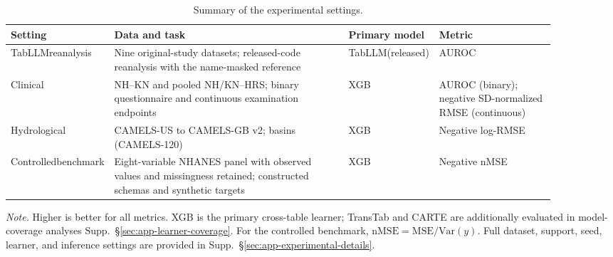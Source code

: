 \documentclass{article} %
\newcommand{\supp}[1]{\textnormal{Supp.~#1}}
\begin{document}
\begin{table}[h]
\caption{Summary of the experimental settings.}
\label{tab:experimental_settings}
\centering
\fontsize{8pt}{9pt}\selectfont
\setlength{\tabcolsep}{3pt}

\begin{tabular}{@{}p{0.12\linewidth}p{0.45\linewidth}p{0.1\linewidth}p{0.22\linewidth}@{}}
\toprule
Setting & Data and task & Primary model & Metric \\
\midrule

TabLLM\newline reanalysis &
Nine original-study datasets; released-code reanalysis with the name-masked reference &
TabLLM\newline (released) &
AUROC \\

\midrule

Clinical &
NH--KN and pooled NH/KN--HRS; binary questionnaire and continuous examination endpoints &
XGB &
AUROC (binary); \newline negative SD-normalized RMSE (continuous) \\

\addlinespace

Hydrological &
CAMELS-US to CAMELS-GB v2; \newline 120 basins (CAMELS-120) &
XGB &
Negative log-RMSE \\

\midrule

Controlled\newline benchmark &
Eight-variable NHANES panel with observed values and missingness retained; constructed schemas and synthetic targets &
XGB &
Negative nMSE \\

\bottomrule
\end{tabular}

\vspace{2pt}

\begin{minipage}{\linewidth}
\fontsize{8pt}{9pt}\selectfont
\emph{Note.}
Higher is better for all metrics.
XGB is the primary cross-table learner; TransTab and CARTE are additionally evaluated in model-coverage analyses \supp{\S\ref{sec:app-learner-coverage}}.
For the controlled benchmark, $\mathrm{nMSE}=\mathrm{MSE}/\mathrm{Var}(y)$.
Full dataset, support, seed, learner, and inference settings are provided in \supp{\S\ref{sec:app-experimental-details}}.
\end{minipage}
\end{table}
\end{document}
